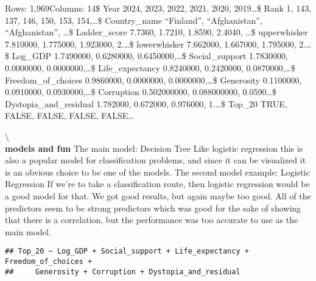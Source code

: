 \documentclass[
]{article}
\begin{document}
Rows: 1,969\newline   Columns: 14\newline   \$ Year 2024, 2023, 2022,
2021, 2020, 2019\ldots{}\newline   \$ Rank 1, 143, 137, 146, 150, 153,
154,\ldots{}\newline   \$ Country\_name ``Finland'', ``Afghanistan'',
``Afghanistan'', \ldots{}\newline   \$ Ladder\_score 7.7360, 1.7210,
1.8590, 2.4040, \ldots{}\newline   \$ upperwhisker 7.810000, 1.775000,
1.923000, 2.\ldots{}\newline   \$ lowerwhisker 7.662000, 1.667000,
1.795000, 2.\ldots{}\newline   \$ Log\_GDP 1.7490000, 0.6280000,
0.6450000,\ldots{}\newline   \$ Social\_support 1.7830000, 0.0000000,
0.0000000,\ldots{}\newline   \$ Life\_expectancy 0.8240000, 0.2420000,
0.0870000,\ldots{}\newline   \$ Freedom\_of\_choices 0.9860000,
0.0000000, 0.0000000,\ldots{}\newline   \$ Generosity 0.1100000,
0.0910000, 0.0930000,\ldots{}\newline   \$ Corruption 0.502000000,
0.088000000, 0.0590\ldots{}\newline \$ Dystopia\_and\_residual 1.782000,
0.672000, 0.976000, 1.\ldots{}\newline   \$ Top\_20 TRUE, FALSE, FALSE,
FALSE, FALSE\ldots{}\newline  

\textbackslash{}\\
\textbf{models and fun} The main model: Decision Tree Like logistic
regression this is also a popular model for classification problems, and
since it can be visualized it is an obvious choice to be one of the
models. The second model example: Logistic Regression If we're to take a
classification route, then logistic regression would be a good model for
that. We got good results, but again maybe too good. All of the
predictors seem to be strong predictors which was good for the sake of
showing that there is a correlation, but the performance was too
accurate to use as the main model.

\begin{verbatim}
## Top_20 ~ Log_GDP + Social_support + Life_expectancy + Freedom_of_choices + 
##     Generosity + Corruption + Dystopia_and_residual
\end{verbatim}
\end{document}
